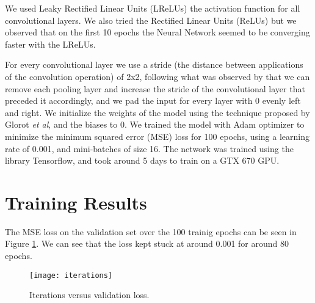 We used Leaky Rectified Linear Units (LReLUs) the activation function for all convolutional layers. We also tried the Rectified Linear Units (ReLUs) but we observed that on the first 10 epochs the Neural Network seemed to be converging faster with the LReLUs. 

For every convolutional layer we use a stride (the distance between applications of the convolution operation) of 2x2, following what was observed by \cite{springenberg2014striving} that we can remove each pooling layer and increase the stride of the convolutional layer that preceded it accordingly, and we pad the input for every layer with 0 evenly left and right. We initialize the weights of the model using the technique proposed by Glorot \textit{et al}\cite{glorot2010understanding}, and the biases to 0. We trained the model with Adam optimizer to minimize the minimum squared error (MSE) loss for 100 epochs, using a learning rate of 0.001, and mini-batches of size 16. The network was trained using the library Tensorflow, and took around 5 days to train on a GTX 670 GPU.

\section{Training Results}
The MSE loss on the validation set over the 100 trainig epochs can be seen in Figure \ref{fig:trainingMSE}. We can see that the loss kept stuck at around 0.001 for around 80 epochs.
\begin{figure}[!htb]
\centering
\texttt{[image: iterations]}

\caption{Iterations versus validation loss.}
\label{fig:trainingMSE}

\end{figure}

